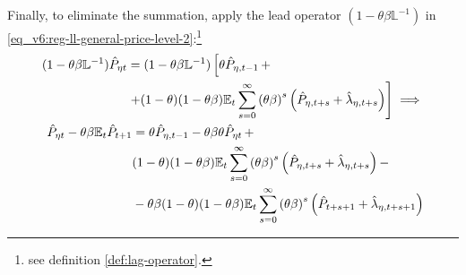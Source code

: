 \documentclass[../thesis.tex]{subfiles}
\begin{document}
Finally, to eliminate the summation, apply the lead operator $(1- \theta \beta \mathbb{L}^{-1})$ in \ref{eq_v6:reg-ll-general-price-level-2}:\footnote{see definition \ref{def:lag-operator}.}
\begin{align}
	\begin{split}
		(1- \theta \beta \mathbb{L}^{-1}) \hat{P}_{\eta t} &= (1- \theta \beta \mathbb{L}^{-1}) \left[ \theta \hat{P}_{\eta, t-1} \, + \right. \\
		&\left. + (1-\theta) (1- \theta \beta) {\mathbb{E}_{t}} \sum_{s=0}^{\infty} \left( \theta \beta \right)^s \left( \hat{P}_{\eta, t+s} + \hat{\lambda}_{\eta, t+s} \right) \right] \implies \nonumber
	\end{split} \\
	\begin{split}
		\hat{P}_{\eta t} - \theta \beta {\mathbb{E}_{t}} \hat{P}_{t+1} &= \theta \hat{P}_{\eta, t-1} - \theta \beta \theta \hat{P}_{\eta t} \, + \\
		& (1-\theta) (1- \theta \beta) {\mathbb{E}_{t}} \sum_{s=0}^{\infty} \left( \theta \beta \right)^s \left( \hat{P}_{\eta, t+s} + \hat{\lambda}_{\eta, t+s} \right) - \\
		& - \theta \beta (1-\theta) (1- \theta \beta) {\mathbb{E}_{t}} \sum_{s=0}^{\infty} \left( \theta \beta \right)^s \left( \hat{P}_{t+s+1} + \hat{\lambda}_{\eta, t+s+1} \right)
	\end{split} \label{eq_v6:reg-ll-general-price-level-3}
\end{align}
\end{document}
